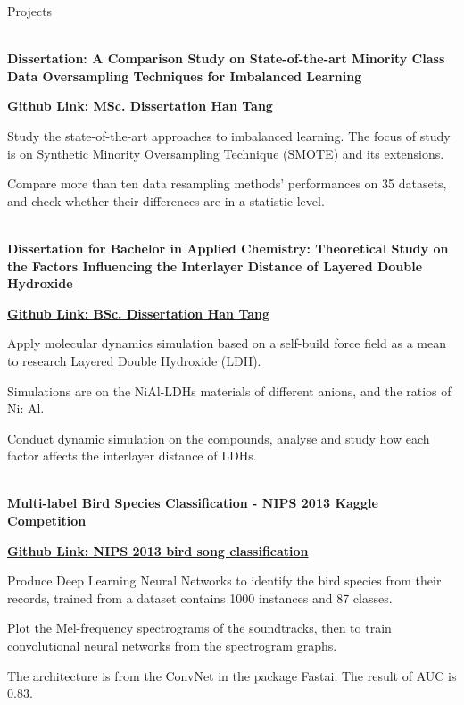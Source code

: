 \documentclass{resume} %
\begin{document}
\begin{rSection}{Projects}

\\{\bf Dissertation: A Comparison Study on State-of-the-art Minority Class Data Oversampling Techniques for Imbalanced Learning }

\href{https://github.com/HirahTang/MScDissertation_Han_Tang}{\bf Github Link: MSc. Dissertation Han Tang}

Study the state-of-the-art approaches to imbalanced learning. The focus of study is on Synthetic Minority Oversampling Technique (SMOTE) and its extensions.

Compare more than ten data resampling methods' performances on 35 datasets, and check whether their differences are in a statistic level.

\\{\bf Dissertation for Bachelor in Applied Chemistry: Theoretical Study on the Factors Influencing the Interlayer Distance of Layered Double Hydroxide}

\href{https://github.com/HirahTang/Han-Tang-BSc-Dissertation}{\bf Github Link: BSc. Dissertation Han Tang}

Apply molecular dynamics simulation based on a self-build force field as a mean to research Layered Double Hydroxide (LDH). 

Simulations are on the NiAl-LDHs materials of different anions, and the ratios of Ni: Al.

Conduct dynamic simulation on the compounds, analyse and study how each factor affects the interlayer distance of LDHs.


\\{\bf Multi-label Bird Species Classification - NIPS 2013 Kaggle Competition}

\href{https://github.com/HirahTang/NIPS-2013-Bird-song-classification}{\bf Github Link: NIPS 2013 bird song classification}

Produce Deep Learning Neural Networks to identify the bird species from their records, trained from a dataset contains 1000 instances and 87 classes.

Plot the Mel-frequency spectrograms of the soundtracks, then to train convolutional neural networks from the spectrogram graphs.

The architecture is from the ConvNet in the package Fastai. The result of AUC is 0.83.







\end{rSection}
\end{document}

